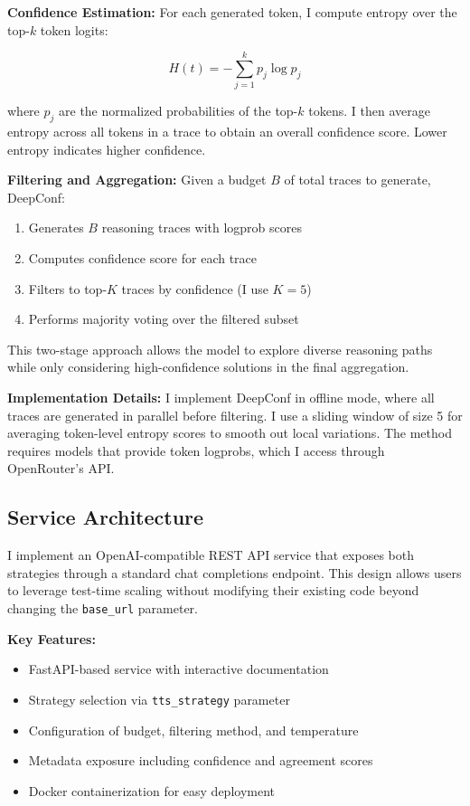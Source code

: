 \documentclass[11pt]{article}
\begin{document}
\textbf{Confidence Estimation:} For each generated token, I compute entropy over the top-$k$ token logits:

\begin{equation}
H(t) = -\sum_{j=1}^{k} p_j \log p_j
\end{equation}

where $p_j$ are the normalized probabilities of the top-$k$ tokens. I then average entropy across all tokens in a trace to obtain an overall confidence score. Lower entropy indicates higher confidence.

\textbf{Filtering and Aggregation:} Given a budget $B$ of total traces to generate, DeepConf:
\begin{enumerate}
    \item Generates $B$ reasoning traces with logprob scores
    \item Computes confidence score for each trace
    \item Filters to top-$K$ traces by confidence (I use $K=5$)
    \item Performs majority voting over the filtered subset
\end{enumerate}

This two-stage approach allows the model to explore diverse reasoning paths while only considering high-confidence solutions in the final aggregation.

\textbf{Implementation Details:} I implement DeepConf in offline mode, where all traces are generated in parallel before filtering. I use a sliding window of size 5 for averaging token-level entropy scores to smooth out local variations. The method requires models that provide token logprobs, which I access through OpenRouter's API.

\subsection{Service Architecture}

I implement an OpenAI-compatible REST API service that exposes both strategies through a standard chat completions endpoint. This design allows users to leverage test-time scaling without modifying their existing code beyond changing the \texttt{base\_url} parameter.

\textbf{Key Features:}
\begin{itemize}
    \item FastAPI-based service with interactive documentation
    \item Strategy selection via \texttt{tts\_strategy} parameter
    \item Configuration of budget, filtering method, and temperature
    \item Metadata exposure including confidence and agreement scores
    \item Docker containerization for easy deployment
\end{itemize}
\end{document}
